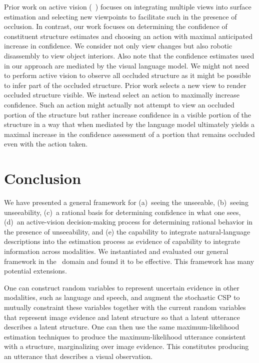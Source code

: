 Prior work on active vision (\eg\ ) focuses on integrating
multiple views into surface estimation and selecting new viewpoints to
facilitate such in the presence of occlusion.
%
In contrast, our work focuses on determining the confidence of constituent
structure estimates and choosing an action with maximal anticipated increase in
confidence.
%
We consider not only view changes but also robotic disassembly to view object
interiors.
%
Also note that the confidence estimates used in our approach are mediated by
the visual language model.
%
We might not need to perform active vision to observe all occluded structure as
it might be possible to infer part of the occluded structure.
%
Prior work selects a new view to render occluded structure visible.
%
We instead select an action to maximally increase confidence.
%
Such an action might actually not attempt to view an occluded portion of the
structure but rather increase confidence in a visible portion of the structure
in a way that when mediated by the language model ultimately yields a maximal
increase in the confidence assessment of a portion that remains occluded even
with the action taken.

\par\vspace{-1ex}
\section{Conclusion}
\label{sec:conclusion}

We have presented a general framework for (a)~seeing the unseeable, (b)~seeing
unseeability, (c)~a rational basis for determining confidence in what one sees,
(d)~an active-vision decision-making process for determining rational behavior
in the presence of unseeability, and (e) the capability to integrate
natural-language descriptions into the estimation process as evidence of
capability to integrate information across modalities.
%
We instantiated and evaluated our general framework in the
\LincolnLog\ domain and found it to be effective.
%
This framework has many potential extensions.

One can construct random variables to represent uncertain evidence in other
modalities, such as language and speech, and augment the stochastic CSP
to mutually constraint these variables together with the current random
variables that represent image evidence and latent structure so that a latent
utterance describes a latent structure.
%
One can then use the same maximum-likelihood estimation techniques to produce
the maximum-likelihood utterance consistent with a structure, marginalizing
over image evidence.
%
This constitutes producing an utterance that describes a visual observation.

